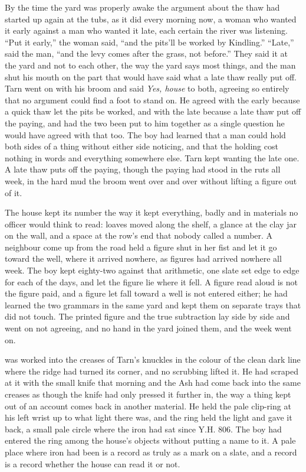 By the time the yard was properly awake the argument about the thaw had started up again at the tubs, as it did every morning now, a woman who wanted it early against a man who wanted it late, each certain the river was listening. “Put it early,” the woman said, “and the pits'll be worked by Kindling.” “Late,” said the man, “and the levy comes after the grass, not before.” They said it at the yard and not to each other, the way the yard says most things, and the man shut his mouth on the part that would have said what a late thaw really put off. Tarn went on with his broom and said \emph{Yes, house} to both, agreeing so entirely that no argument could find a foot to stand on. He agreed with the early because a quick thaw let the pits be worked, and with the late because a late thaw put off the paying, and had the two been put to him together as a single question he would have agreed with that too. The boy had learned that a man could hold both sides of a thing without either side noticing, and that the holding cost nothing in words and everything somewhere else. Tarn kept wanting the late one. A late thaw puts off the paying, though the paying had stood in the ruts all week, in the hard mud the broom went over and over without lifting a figure out of it.

The house kept its number the way it kept everything, badly and in materials no officer would think to read: loaves moved along the shelf, a glance at the clay jar on the wall, and a space at the row's end that nobody called a number. A neighbour come up from the road held a figure shut in her fist and let it go toward the well, where it arrived nowhere, as figures had arrived nowhere all week. The boy kept eighty-two against that arithmetic, one slate set edge to edge for each of the days, and let the figure lie where it fell. A figure read aloud is not the figure paid, and a figure let fall toward a well is not entered either; he had learned the two grammars in the same yard and kept them on separate trays that did not touch. The printed figure and the true subtraction lay side by side and went on not agreeing, and no hand in the yard joined them, and the week went on.

 was worked into the creases of Tarn's knuckles in the colour of the clean dark line where the ridge had turned its corner, and no scrubbing lifted it. He had scraped at it with the small knife that morning and the Ash had come back into the same creases as though the knife had only pressed it further in, the way a thing kept out of an account comes back in another material. He held the pale clip-ring at his left wrist up to what light there was, and the ring held the light and gave it back, a small pale circle where the iron had sat since Y.H. 806. The boy had entered the ring among the house's objects without putting a name to it. A pale place where iron had been is a record as truly as a mark on a slate, and a record is a record whether the house can read it or not.

